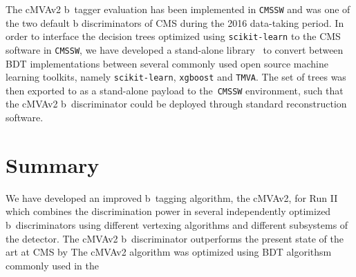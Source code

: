 The cMVAv2 b~tagger evaluation has been implemented in \texttt{CMSSW} and was one of the two default b discriminators of CMS during the 2016 data-taking period. In order to interface the decision trees optimized using \texttt{scikit-learn} to the CMS software in \texttt{CMSSW}, we have developed a stand-alone library~\cite{mlglue} to convert between BDT implementations between several commonly used open source machine learning toolkits, namely \texttt{scikit-learn}, \texttt{xgboost} and \texttt{TMVA}. The set of trees was then exported to as a stand-alone payload to the~\texttt{CMSSW} environment, such that the cMVAv2 b~discriminator could be deployed through standard reconstruction software.

\section{Summary}
We have developed an improved b~tagging algorithm, the cMVAv2, for Run II which combines the discrimination power in several independently optimized b~discriminators using different vertexing algorithms and different subsystems of the detector. The cMVAv2 b~discriminator outperforms the present state of the art at CMS by  
The cMVAv2 algorithm was optimized using BDT algorithsm commonly used in the  